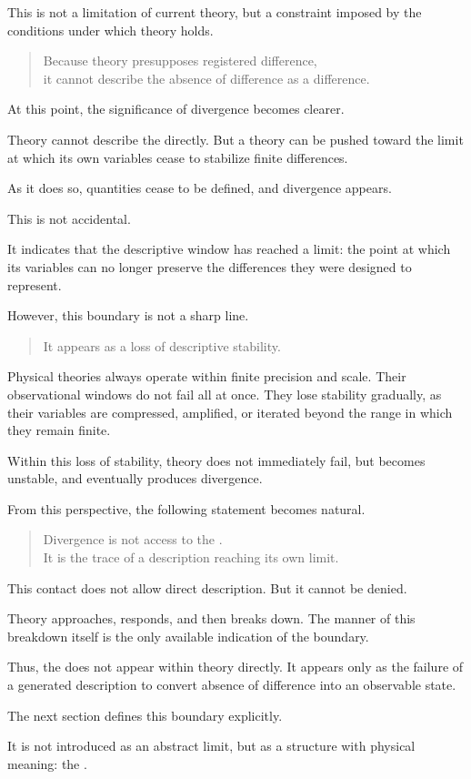 This is not a limitation of current theory,
but a constraint imposed by the conditions under which theory holds.

\medskip
\begin{quote}
Because theory presupposes registered difference,\\
it cannot describe the absence of difference as a difference.
\end{quote}
\medskip

At this point,
the significance of divergence becomes clearer.

Theory cannot describe the \ungenerated{} directly.
But a theory can be pushed toward the limit
at which its own variables cease to stabilize finite differences.

As it does so,
quantities cease to be defined,
and divergence appears.

This is not accidental.

It indicates that the descriptive window has reached a limit:
the point at which its variables can no longer preserve
the differences they were designed to represent.

However,
this boundary is not a sharp line.

\medskip
\begin{quote}
It appears as a loss of descriptive stability.
\end{quote}
\medskip

Physical theories always operate within finite precision and scale.
Their observational windows do not fail all at once.
They lose stability gradually,
as their variables are compressed,
amplified,
or iterated beyond the range in which they remain finite.

Within this loss of stability,
theory does not immediately fail,
but becomes unstable,
and eventually produces divergence.

From this perspective,
the following statement becomes natural.

\medskip
\begin{quote}
Divergence is not access to the \ungenerated{}.\\
It is the trace of a description reaching its own limit.
\end{quote}
\medskip

This contact does not allow direct description.
But it cannot be denied.

Theory approaches, responds, and then breaks down.
The manner of this breakdown itself
is the only available indication of the boundary.

Thus,
the \ungenerated{} does not appear within theory directly.
It appears only as the failure of a generated description
to convert absence of difference into an observable state.

The next section defines this boundary explicitly.

It is not introduced as an abstract limit,
but as a structure with physical meaning:
the \DH{}.
